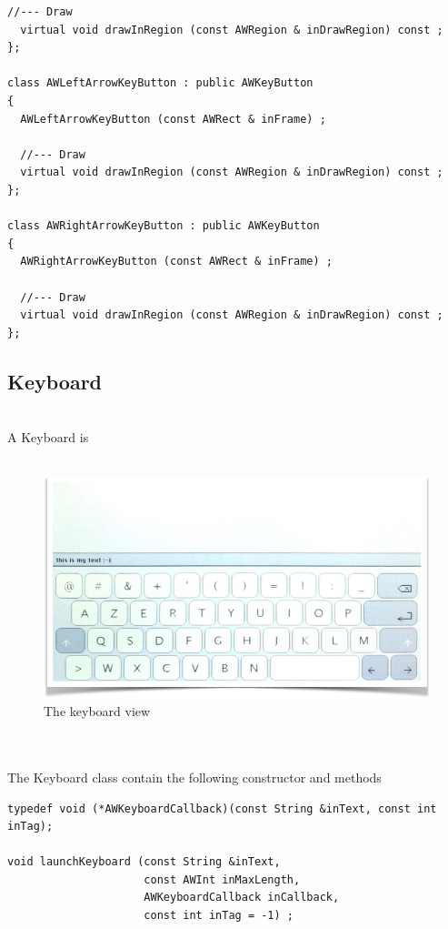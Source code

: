 \documentclass[a4paper,11pt]{extarticle}
\begin{document}
\begin{lstlisting}[language=Arduinonl]
  //--- Draw
  virtual void drawInRegion (const AWRegion & inDrawRegion) const ;
};

class AWLeftArrowKeyButton : public AWKeyButton
{
  AWLeftArrowKeyButton (const AWRect & inFrame) ;
  
  //--- Draw
  virtual void drawInRegion (const AWRegion & inDrawRegion) const ;
};

class AWRightArrowKeyButton : public AWKeyButton
{
  AWRightArrowKeyButton (const AWRect & inFrame) ;
  
  //--- Draw
  virtual void drawInRegion (const AWRegion & inDrawRegion) const ;
};
\end{lstlisting}


\newpage
\subsection{Keyboard}

~\\ A Keyboard is 
~\\
~\\

\begin{figure}[htbp]
   \centering
   \includegraphics[scale=0.55]{AWFig18.png} 
   \caption{The keyboard view}
   \label{fig:18 }
\end{figure}

~\\

~\\ The Keyboard class contain the following constructor and methods

\begin{lstlisting}[language=Arduinonl]
typedef void (*AWKeyboardCallback)(const String &inText, const int inTag);

void launchKeyboard (const String &inText,
                     const AWInt inMaxLength,
                     AWKeyboardCallback inCallback,
                     const int inTag = -1) ;
\end{lstlisting}
\end{document}
